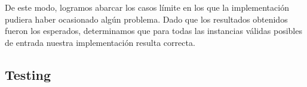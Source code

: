 De este modo, logramos abarcar los casos límite en los que la implementación pudiera haber ocasionado algún problema. Dado que los resultados obtenidos fueron los esperados, determinamos que para todas las instancias válidas posibles de entrada nuestra implementación resulta correcta.

\subsection{Testing}
